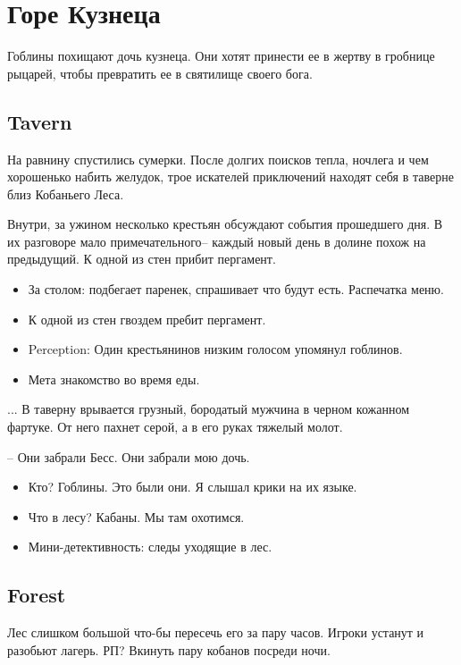\documentclass[a5paper,11pt]{book}
\begin{document}
\chapter{Горе Кузнеца}
Гоблины похищают дочь кузнеца. Они хотят принести ее в жертву в гробнице рыцарей, чтобы превратить ее в святилище своего бога.
\section{Tavern}

\begin{framed}
На равнину спустились сумерки. После долгих поисков тепла, ночлега и чем хорошенько набить желудок, трое искателей приключений находят себя в таверне близ Кобаньего Леса.

Внутри, за ужином несколько крестьян обсуждают события прошедшего дня. В их разговоре мало примечательного-- каждый новый день в долине похож на предыдущий. К одной из стен прибит пергамент.
\end{framed}

\begin{itemize}
  \item За столом: подбегает паренек, спрашивает что будут есть. Распечатка меню.
  \item К одной из стен гвоздем пребит пергамент.
  \item Perception: Один крестьянинов низким голосом упомянул гоблинов.
  \item Мета знакомство во время еды.
\end{itemize}

\begin{framed}
... В таверну врывается грузный, бородатый мужчина в черном кожанном фартуке. От него пахнет серой, а в его руках тяжелый молот.

-- Они забрали Бесс. Они забрали мою дочь.
\end{framed}

\begin{itemize}
  \item Кто? Гоблины. Это были они. Я слышал крики на их языке.
  \item Что в лесу? Кабаны. Мы там охотимся.
  \item Мини-детективность: следы уходящие в лес.
\end{itemize}

\section{Forest}
Лес слишком большой что-бы пересечь его за пару часов. Игроки устанут и разобьют лагерь. РП? Вкинуть пару кобанов посреди ночи.
\end{document}
